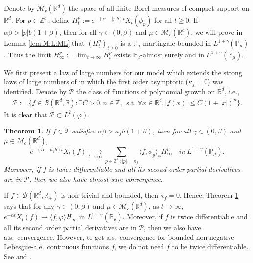 \documentclass[12pt,a4paper]{amsart}
\theoremstyle{plain}
\newtheorem{thm}{Theorem}[section]
\theoremstyle{definition}
\numberwithin{equation}{section}
\begin{document}
Denote by $\mathcal M_c(\mathbb R^d)$ the space of all finite Borel measures of compact support on $\mathbb R^d$.
For $p\in \mathbb{Z}_+^d$, define
\(
  H_t^p
  := e^{-(\alpha-|p|b)t}X_t(\phi_p)
\)
for all $t\geq 0$.
If $\alpha\beta>|p|b(1+\beta)$, then for all $\gamma\in (0, \beta)$ and $\mu\in \mathcal M_c(\mathbb R^d)$, we will prove in Lemma \ref{lem:M:L:ML} that $(H_t^p)_{t\geq 0}$ is a $\mathbb{P}_{\mu}$-martingale bounded in $L^{1+\gamma}(\mathbb{P}_{\mu})$.
Thus the limit $H^p_{\infty}:=\lim_{t\rightarrow \infty}H_t^p$ exists $\mathbb{P}_{\mu}$-almost surely and in $L^{1+\gamma}(\mathbb{P}_{\mu})$.

We first present a law of large numbers for our model which extends the strong laws of large numbers of \cite{ChenRenYang2019Skeleton, EckhoffKyprianouWinkel2015Spines} in which the first order asymptotic ($\kappa_f=0$) was identified.
Denote by $\mathcal P$ the class of functions of polynomial growth on $\mathbb R^d$, i.e.,
\begin{align}
  \label{eq: polynomial growth function}
  \mathcal{P}
  := \{f\in \mathcal B(\mathbb R^d, \mathbb R):\exists C>0, n \in \mathbb Z_+ \text{~s.t.~} \forall x\in \mathbb R^d, |f(x)|\leq C(1+|x|)^n \}.
\end{align}
It is clear that $\mathcal{P} \subset L^2(\varphi)$.
\begin{thm}
  \label{thm: law of large number}
  If $f \in \mathcal{P}$ satisfies $\alpha\beta>\kappa_fb(1+\beta)$, then for all $\gamma\in (0, \beta)$ and  $\mu\in \mathcal M_c(\mathbb R^d)$,
  \[
    e^{-(\alpha-\kappa_fb)t}X_t(f)
    \xrightarrow[t\to \infty]{}\sum_{p\in \mathbb Z_+^d:|p|=\kappa_f}\langle f, \phi_p\rangle_{\varphi} H_{\infty}^p
    \quad in~ L^{1+\gamma}(\mathbb{P}_{\mu}).
  \]
  Moreover, if $f$ is twice differentiable and all its second order partial derivatives are in $\mathcal{P}$, then we also have almost sure convergence.
\end{thm}
If $f\in \mathcal B(\mathbb R^d, \mathbb R_+)$ is non-trivial and  bounded, then $\kappa_f=0$.
Hence, Theorem \ref{thm: law of large number} says that for any $\gamma\in (0, \beta)$ and  $\mu\in \mathcal M_c(\mathbb R^d)$, as $t\rightarrow \infty$,
\(
  e^{-\alpha t}X_t(f)
  \rightarrow \langle f, \varphi\rangle H_{\infty}
\)
in $L^{1+\gamma}(\mathbb{P}_{\mu})$.
Moreover, if $f$ is twice differentiable and all its second order partial derivatives are in $\mathcal{P}$, then we also have a.s.\ convergence.
However, to get a.s.\ convergence for bounded non-negative
Lebesgue-a.e.\ continuous functions $f$, we do not need $f$ to be twice differentiable.
See \cite[Theorem 2.13 \& Example 8.1]{ChenRenYang2019Skeleton} and \cite[Theorem 1.2 \& Example 4.1]{EckhoffKyprianouWinkel2015Spines}.
\end{document}
